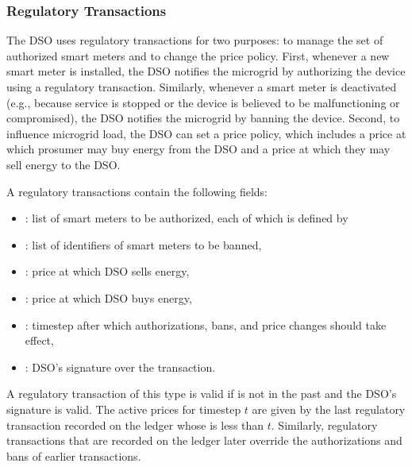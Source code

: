 \subsubsection{Regulatory Transactions}

The DSO uses regulatory transactions for two purposes: to manage the set of authorized smart meters and to change the price policy.
First, whenever a new smart meter is installed, the DSO notifies the microgrid by authorizing the device using a regulatory transaction.
Similarly, whenever a smart meter is deactivated (e.g., because service is stopped or the device is believed to be malfunctioning or compromised), the DSO notifies the microgrid by banning the device.
Second, to influence microgrid load, the DSO can set a price policy, which includes a price at which prosumer may buy energy from the DSO and a price at which they may sell energy to the DSO.

A regulatory transactions contain the following fields:
\begin{itemize}[noitemsep,topsep=-\parskip]
\item {}: list of smart meters to be authorized, each of which is defined by
\item {}: list of identifiers of smart meters to be banned, 
\item {}: price at which DSO sells energy,
\item {}: price at which DSO buys energy,
\item {}: timestep after which authorizations, bans, and price changes should take effect,
\item {}: DSO's signature over the transaction.
\end{itemize}
\vspace{\parskip}

A regulatory transaction of this type is valid if %
{} is not in the past and %
the DSO's signature is valid.
%
The active prices for timestep $t$ are given by the last regulatory transaction recorded on the ledger whose  is less than $t$.
Similarly, regulatory transactions that are recorded on the ledger later override the authorizations and bans of earlier transactions.

